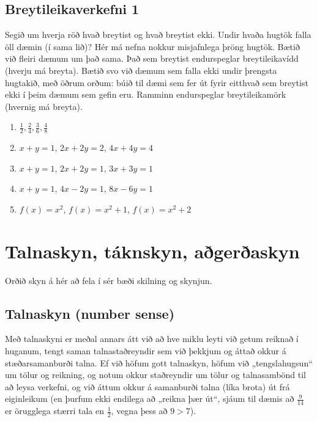 \documentclass[
  icelandic,
]{book}
\providecommand{\tightlist}{%
  \setlength{\itemsep}{0pt}\setlength{\parskip}{0pt}}
\begin{document}
\section{Breytileikaverkefni 1}\label{verkefni_breytileiki_1}

Segið um hverja röð hvað breytist og hvað breytist ekki. Undir hvaða hugtök falla öll dæmin (í sama lið)? Hér má nefna nokkur misjafnlega þröng hugtök. Bætið við fleiri dæmum um það sama. Það sem breytist endurspeglar breytileikavídd (hverju má breyta). Bætið svo við dæmum sem falla ekki undir þrengsta hugtakið, með öðrum orðum: búið til dæmi sem fer út fyrir eitthvað sem breytist ekki í þeim dæmum sem gefin eru. Ramminn endurspeglar breytileikamörk (hvernig má breyta).

\begin{enumerate}
\def\labelenumi{\arabic{enumi}.}
\tightlist
\item
  \(\frac{1}{2}, \frac{2}{4}, \frac{3}{6}, \frac{4}{8}\)
\item
  \(x+y=1\), \(2x+2y=2\), \(4x+4y=4\)
\item
  \(x+y=1\), \(2x+2y=1\), \(3x+3y=1\)
\item
  \(x+y=1\), \(4x-2y=1\), \(8x-6y=1\)
\item
  \(f(x)=x^2\), \(f(x)=x^2+1\), \(f(x)=x^2+2\)
\end{enumerate}

\chapter{Talnaskyn, táknskyn, aðgerðaskyn}\label{skyn}

Orðið skyn á hér að fela í sér bæði skilning og skynjun.

\section{Talnaskyn (number sense)}\label{talnaskyn}

Með talnaskyni er meðal annars átt við að hve miklu leyti við getum reiknað í huganum, tengt saman talnastaðreyndir sem við þekkjum og áttað okkur á stæðarsamanburði talna. Ef við höfum gott talnaskyn, höfum við „tengslahugsun`` um tölur og reikning, og notum okkur staðreyndir um tölur og talnasambönd til að leysa verkefni, og við áttum okkur á samanburði talna (líka brota) út frá eiginleikum (en þurfum ekki endilega að „reikna þær út``, sjáum til dæmis að \(\frac{9}{14}\) er örugglega stærri tala en \(\frac{1}{2}\), vegna þess að \(9>7\)).
\end{document}
